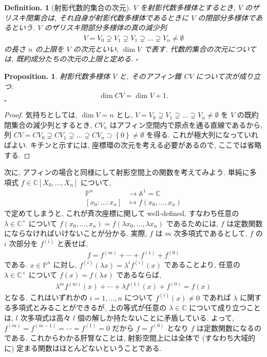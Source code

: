 \documentclass[openany, a4paper, oneside]{jsbook}
\theoremstyle{break}
\theoremstyle{breakdefn}
\newtheorem{prop}[thm]{Proposition.}
\newtheorem{defn}[thm]{Definition.}
\newcommand{\cbk}[1]{\left\{#1\right\}}
\newcommand{\fin}{\hfill $\square$ \par}
\newcommand{\map}{\longrightarrow}
\begin{document}
\begin{defn}[射影代数的集合の次元]
$V$ を射影代数多様体とするとき, $V$ のザリスキ閉集合は, それ自身が射影代数多様体であるときに $V$ の閉部分多様体であるという.
$V$ のザリスキ閉部分多様体の真の減少列
\begin{align}
 V=V_0 \supsetneq V_1 \supsetneq V_1 \supsetneq \dots \supsetneq V_n \neq \emptyset
\end{align}
の長さ $n$ の上限を $V$ の次元といい,  $\dim V$ で表す.
代数的集合の次元については, 既約成分たちの次元の上限と定める. \fin
\end{defn}
\begin{prop}
射影代数多様体 $V$ と, そのアフィン錐 $CV$ について次が成り立つ.
\begin{align}
 \dim CV
 =
 \dim V + 1.
\end{align}
\fin
\end{prop}
\begin{proof}
気持ちとしては, $\dim V = n$ とし,
$V=V_0 \supsetneq V_1 \supsetneq \dots \supsetneq V_n \neq \emptyset$ を $V$ の既約閉集合の減少列とするとき,
$CV_n$ はアフィン空間内で原点を通る直線であるから, 列
$CV=CV_0 \supsetneq CV_1 \supsetneq \dots \supsetneq CV_n \supset \cbk{0} \neq \emptyset$ を得る.
これが極大列になっていればよい.
キチンと示すには, 座標環の次元を考える必要があるので, ここでは省略する.
\end{proof}

次に, アフィンの場合と同様にして射影空間上の関数を考えてみよう.
単純に多項式 $f \in \mathbb{C}[X_0,\dots,X_n]$ について,
\begin{align}
 \mathbb{P}^n
 &\map
 \mathbb{A}^1
 = \mathbb{C} \\
 [x_0:\dots:x_n]
 &\longmapsto
 f(x_0,\dots,x_n)
\end{align}
で定めてしまうと, これが斉次座標に関して well-defined,
すなわち任意の $\lambda \in \mathbb{C}^{\times}$ について
$f(x_0,\dots,x_n) = f (\lambda x_0,\dots,\lambda x_n)$ であるためには,
$f$ は定数関数にならなければいけないことが分かる.
実際, $f$ は $m$ 次多項式であるとして, $f$ の $i$ 次部分を $f^{(i)}$ と表せば,
\begin{align}
 f
 =
 f^{(m)} + \cdots + f^{(1)} + f^{(0)}
\end{align}
である.
$x \in \mathbb{P}^n$ に対し, $f^{(i)}(\lambda x) = \lambda^i f^{(i)}(x)$ であることより,
任意の $\lambda \in \mathbb{C}^{\times}$ について $f (x) = f (\lambda x)$ であるならば,
\begin{align}
 \lambda^m f^{(m)}(x) + \cdots + \lambda f^{(1)}(x) + f^{(0)}
 =
 f (x)
\end{align}
となる.
これはいずれかの $i =1,\dots,n$ について $f^{(i)}(x) \neq 0$ であれば $\lambda$ に関する多項式とみることができるが,
上の等式が任意の $\lambda \in \mathbb{C}$ について成り立つことは,
$l$ 次多項式は高々 $l$ 個の解しか持たないことに矛盾している.
よって, $f^{(m)} = f^{(m-1)} = \cdots = f^{(1)} = 0$ だから  $f=f^{(0)}$ となり $f$ は定数関数になるのである.
これからわかる肝腎なことは, 射影空間上には全体で (すなわち大域的に) 定まる関数はほとんどないということである.
\end{document}
